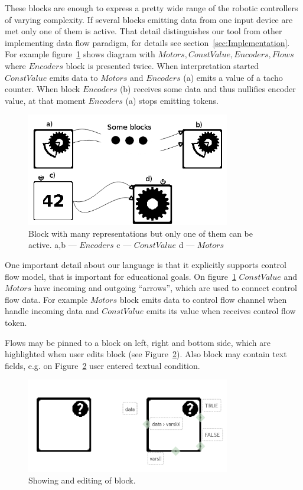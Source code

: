 \documentclass[conference,compsoc]{IEEEtran}
\begin{document}
These blocks are enough to express a pretty wide range of the robotic controllers of varying complexity. If several blocks emitting data from one input device are met only one of them is active. That detail distinguishes our tool from other implementing data flow paradigm, for details see section~\ref{sec:Implementation}. For example figure~\ref{image:encoder} shows diagram with $Motors, ConstValue, Encoders, Flows$ where $Encoders$ block is presented twice. When interpretation started $ConstValue$ emits data to $Motors$ and $Encoders$ (a) emits a value of a tacho counter. When block $Encoders$ (b) receives some data and thus nullifies encoder value, at that moment $Encoders$ (a) stops emitting tokens.

\begin{figure}[ht]
	\centering
	\includegraphics[width=3.5in]{Encoders.png}
	\caption{Block with many representations but only one of them can be active. a,b --- $Encoders$ c --- $ConstValue$ d --- $Motors$}
	\label{image:encoder}
\end{figure}


One important detail about our language is that it explicitly supports control flow model, that is important for educational goals. On figure~\ref{image:encoder} $ConstValue$ and $Motors$ have incoming and outgoing ``arrows'', which are used to connect control flow data. For example $Motors$ block emits data to control flow channel when handle incoming data and $ConstValue$ emits its value when receives control flow token. 

Flows may be pinned to a block on left, right and bottom side, which are highlighted when user edits block (see Figure~\ref{image:block}). Also block may contain text fields, e.g. on Figure~\ref{image:block} user entered textual condition.
\begin{figure}[ht]
	\centering
	\includegraphics[width=3.5in]{block.png}
	\caption{Showing and editing of block.}
	\label{image:block}
\end{figure}
\end{document}
